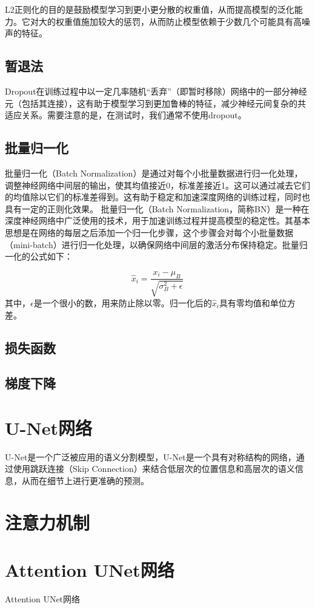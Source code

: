L2正则化的目的是鼓励模型学习到更小更分散的权重值，从而提高模型的泛化能力。它对大的权重值施加较大的惩罚，从而防止模型依赖于少数几个可能具有高噪声的特征。

\subsection{暂退法}
Dropout在训练过程中以一定几率随机“丢弃”（即暂时移除）网络中的一部分神经元（包括其连接），这有助于模型学习到更加鲁棒的特征，减少神经元间复杂的共适应关系。需要注意的是，在测试时，我们通常不使用dropout。
\subsection{批量归一化}
批量归一化（Batch Normalization）是通过对每个小批量数据进行归一化处理，调整神经网络中间层的输出，使其均值接近0，标准差接近1。这可以通过减去它们的均值除以它们的标准差得到。这有助于稳定和加速深度网络的训练过程，同时也具有一定的正则化效果。
批量归一化（Batch Normalization，简称BN）是一种在深度神经网络中广泛使用的技术，用于加速训练过程并提高模型的稳定性。其基本思想是在网络的每层之后添加一个归一化步骤，这个步骤会对每个小批量数据（mini-batch）进行归一化处理，以确保网络中间层的激活分布保持稳定。批量归一化的公式如下：

\begin{equation}
  \hat{x}_i = \frac{x_i - \mu_B}{\sqrt{\sigma_B^2 + \epsilon}} 
\end{equation}
其中，$\epsilon$是一个很小的数，用来防止除以零。归一化后的\(\hat{x}_i\)具有零均值和单位方差。



\subsection{损失函数}
\subsection{梯度下降}
\section{U-Net网络}
U-Net是一个广泛被应用的语义分割模型，U-Net是一个具有对称结构的网络，通过使用跳跃连接（Skip Connection）来结合低层次的位置信息和高层次的语义信息，从而在细节上进行更准确的预测。
\section{注意力机制}
\section{Attention UNet网络}
Attention UNet网络
